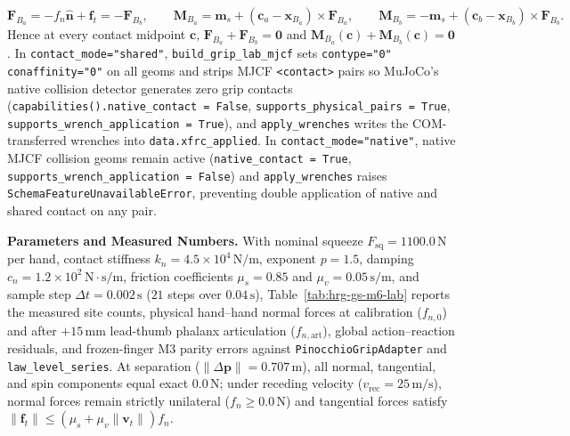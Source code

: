 \documentclass[11pt,a4paper]{article}
\begin{document}
\begin{equation}
\mathbf{F}_{B_a} = -f_n \hat{\mathbf{n}} + \mathbf{f}_t = -\mathbf{F}_{B_b}, \qquad
\mathbf{M}_{B_a} = \mathbf{m}_s + (\mathbf{c}_a - \mathbf{x}_{B_a}) \times \mathbf{F}_{B_a}, \qquad
\mathbf{M}_{B_b} = -\mathbf{m}_s + (\mathbf{c}_b - \mathbf{x}_{B_b}) \times \mathbf{F}_{B_b}.
\end{equation}
Hence at every contact midpoint $\mathbf{c}$, $\mathbf{F}_{B_a} + \mathbf{F}_{B_b} = \mathbf{0}$ and $\mathbf{M}_{B_a}(\mathbf{c}) + \mathbf{M}_{B_b}(\mathbf{c}) = \mathbf{0}$.
In \texttt{contact\_mode="shared"}, \texttt{build\_grip\_lab\_mjcf} sets \texttt{contype="0" conaffinity="0"} on all geoms and strips MJCF \texttt{<contact>} pairs so MuJoCo's native collision detector generates zero grip contacts (\texttt{capabilities().native\_contact = False}, \texttt{supports\_physical\_pairs = True}, \texttt{supports\_wrench\_application = True}), and \texttt{apply\_wrenches} writes the COM-transferred wrenches into \texttt{data.xfrc\_applied}. In \texttt{contact\_mode="native"}, native MJCF collision geoms remain active (\texttt{native\_contact = True}, \texttt{supports\_wrench\_application = False}) and \texttt{apply\_wrenches} raises \texttt{SchemaFeatureUnavailableError}, preventing double application of native and shared contact on any pair.

\textbf{Parameters and Measured Numbers.}
With nominal squeeze $F_{\mathrm{sq}} = 1100.0\,\mathrm{N}$ per hand, contact stiffness $k_n = 4.5 \times 10^{4}\,\mathrm{N/m}$, exponent $p = 1.5$, damping $c_n = 1.2 \times 10^{2}\,\mathrm{N\cdot s/m}$, friction coefficients $\mu_s = 0.85$ and $\mu_v = 0.05\,\mathrm{s/m}$, and sample step $\Delta t = 0.002\,\mathrm{s}$ ($21$ steps over $0.04\,\mathrm{s}$), Table~\ref{tab:hrg-gs-m6-lab} reports the measured site counts, physical hand--hand normal forces at calibration ($f_{n,0}$) and after $+15\,\mathrm{mm}$ lead-thumb phalanx articulation ($f_{n,\mathrm{art}}$), global action--reaction residuals, and frozen-finger M3 parity errors against \texttt{PinocchioGripAdapter} and \texttt{law\_level\_series}. At separation ($\|\Delta \mathbf{p}\| = 0.707\,\mathrm{m}$), all normal, tangential, and spin components equal exact $0.0\,\mathrm{N}$; under receding velocity ($v_{\mathrm{rec}} = 25\,\mathrm{m/s}$), normal forces remain strictly unilateral ($f_n \ge 0.0\,\mathrm{N}$) and tangential forces satisfy $\|\mathbf{f}_t\| \le (\mu_s + \mu_v \|\mathbf{v}_t\|) f_n$.
\end{document}
